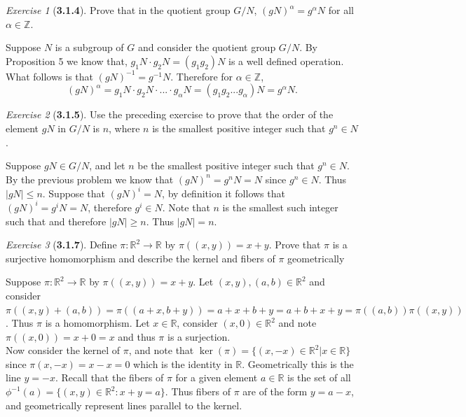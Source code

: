 \documentclass[12pt]{amsart}
\makeatletter
\theoremstyle{remark}
\newtheorem*{exercise}{Exercise}%
\def\RR{\ensuremath{\mathbb R}} %
\def\ZZ{\ensuremath{\mathbb Z}}
\renewenvironment{proof}[1][\proofname]{\par\doublespacing
  \pushQED{\qed}%
  \normalfont \topsep6\p@\@plus6\p@\relax
  \list{}{%
    \settowidth{\leftmargin}{\itshape\proofname:\hskip\labelsep}%
    \setlength{\labelwidth}{0pt}%
    \setlength{\itemindent}{-\leftmargin}%
  }%
  \item[\hskip\labelsep\itshape#1\@addpunct{:}]\ignorespaces
}{%
  \popQED\endlist\@endpefalse
  \singlespacing
}
\theoremstyle{mycomment}
\makeatother
\begin{document}
\begin{exercise}[\textbf{3.1.4}] Prove that in the quotient group $G/N$, $(gN)^\alpha = g^{\alpha}N$ for all 
  $\alpha \in \ZZ$.
    \begin{proof} Suppose $N$ is a subgroup of $G$ and consider the quotient group $G/N$. By Proposition 5 we know that, 
      $g_1N \cdot g_2N = (g_1g_2)N$ is a well defined operation. What follows is that $(gN)^{-1} = g^{-1}N$. Therefore for $\alpha \in \ZZ$, 
      \begin{equation*}
        (gN)^\alpha = g_1N \cdot g_2N \cdot ... \cdot g_\alpha N = (g_1g_2...g_\alpha)N = g^{\alpha}N.
      \end{equation*}
    \end{proof}

\end{exercise}
\vspace{.15in}

\begin{exercise}[\textbf{3.1.5}] Use the preceding exercise to prove that the order of the element $gN$ in $G/N$ is $n$, where $n$ is the smallest positive integer such that $g^n \in N$. 
    \begin{proof} Suppose $gN \in G/N$, and let $n$ be the smallest positive integer such that $g^n \in N$. By the previous 
      problem we know that $(gN)^n = g^nN = N$ since $g^n \in N$. Thus $|gN| \leq n$. Suppose that $(gN)^i = N$, by definition it follows 
      that $(gN)^i = g^iN = N$, therefore $g^i \in N$. Note that $n$ is the smallest such integer such that and therefore $|gN| \geq n$. 
      Thus $|gN| = n$.
    \end{proof}

\end{exercise}
\vspace{.15in}


\begin{exercise}[\textbf{3.1.7}]Define $\pi: \RR^2 \to \RR$ by $\pi((x, y)) = x+y$. Prove that $\pi$ is a surjective homomorphism 
  and describe the kernel and fibers of $\pi$ geometrically
    \begin{proof} Suppose $\pi: \RR^2 \to \RR$ by $\pi((x, y)) = x+y$. Let $(x, y), (a,b) \in \RR^2$ and consider $\pi((x, y) + (a, b)) = \pi((a + x, b + y)) = a + x + b + y = a + b + x + y = \pi((a, b))\pi((x, y))$. 
      Thus $\pi$ is a homomorphism. Let $x \in \RR$, consider $(x, 0) \in \RR^2$ and note $\pi((x, 0)) = x + 0 = x$ and thus $\pi$ is a surjection.\\
      Now consider the kernel of $\pi$, and note that $\ker(\pi) = \{(x, -x) \in \RR^2| x \in \RR\}$ since $\pi(x, -x) = x - x = 0$ which is the identity in $\RR$. 
      Geometrically this is the line $y = -x$. Recall that the fibers of $\pi$ for a given element $a \in \RR$ is the set of all 
      $\phi^{-1}(a) = \{(x, y) \in \RR^2: x + y = a\}$. Thus fibers of $\pi$ are of the form $y = a - x$, and geometrically represent lines parallel to the kernel. 
    \end{proof}
\end{exercise}
\vspace{.15in}
\end{document}
